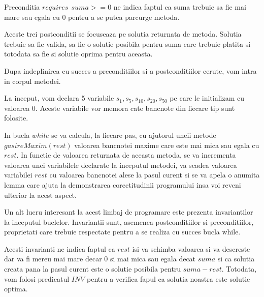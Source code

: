 \par 
Preconditia $requires \ \ suma >= 0$ ne indica faptul ca suma trebuie sa fie mai mare sau egala cu 0 pentru a se putea parcurge metoda.\par 
\vspace{0.5cm}
\par
\vspace{0.25cm}
Aceste trei postconditii se focuseaza pe solutia returnata de metoda. Solutia trebuie sa fie valida, sa fie o solutie posibila pentru suma care trebuie platita si totodata sa fie si solutie oprima pentru aceasta.
\par 
Dupa indeplinirea cu succes a preconditiilor si a postconditiilor cerute, vom intra in corpul metodei. \par 
La inceput, vom declara 5 variabile $s_1, s_5 , s_{10}, s_{20}, s_{50}$ pe care le initializam cu valoarea 0. Aceste variabile vor memora cate bancnote din fiecare tip sunt folosite. \par 
In bucla $while$ se va calcula, la fiecare pas, cu ajutorul uneii metode $gasireMaxim(rest)$ valoarea bancnotei maxime care este mai mica sau egala cu $rest$. In functie de valoarea returnata de aceasta metoda, se va incrementa valoarea unei variabilele declarate la inceputul metodei, va scadea valoarea variabilei $rest$ cu valoarea bancnotei alese la pasul curent si se va apela o anumita lemma care ajuta la demonstrarea corectitudinii programului insa voi reveni ulterior la acest aspect.
\par 

Un alt lucru interesant la acest limbaj de programare este prezenta invariantilor la inceputul buclelor. Invariantii sunt, asemenea postconditiilor si preconditiilor, proprietati care trebuie respectate pentru a se realiza cu succes bucla while.

\vspace{0.5cm}
\par 
\vspace{0.5cm}
Acesti invarianti ne indica faptul ca $rest$ isi va schimba valoarea si va descreste dar va fi mereu mai mare decar 0 si mai mica sau egala decat $suma$ si ca solutia creata pana la pasul curent este o solutie posibila pentru $suma-rest$. 
Totodata, vom folosi predicatul $INV$ pentru a verifica fapul ca solutia noastra este solutie optima. 
\par
